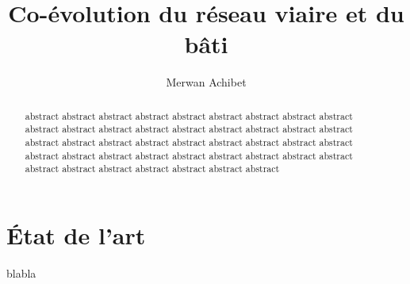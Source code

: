 \documentclass[12pt,twocolumn]{article}
\title{Co-évolution du réseau viaire et du bâti}
\author{Merwan Achibet}
\date{}
\begin{document}
\maketitle

\begin{abstract}
abstract abstract abstract abstract abstract abstract abstract
abstract abstract abstract abstract abstract abstract abstract
abstract abstract abstract abstract abstract abstract abstract
abstract abstract abstract abstract abstract abstract abstract
abstract abstract abstract abstract abstract abstract abstract
abstract abstract abstract abstract abstract abstract abstract
abstract
\end{abstract}

\section{\'Etat de l'art}

blabla
\end{document}
